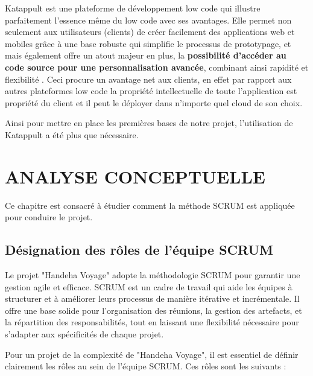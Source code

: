 \documentclass[12pt]{report}
\begin{document}
				Katappult est une plateforme de développement low code qui illustre parfaitement l’essence même du low code avec ses avantages. Elle permet non seulement aux utilisateurs (clients) de créer facilement des applications web et mobiles grâce à une base robuste qui simplifie le processus de prototypage, et mais également offre un atout majeur en plus, la \textbf{possibilité d'accéder au code source pour une personnalisation avancée}, combinant ainsi rapidité et flexibilité \cite{katappult}. Ceci procure un avantage net aux clients, en effet par rapport aux autres plateformes low code la propriété intellectuelle de toute l’application est propriété du client et il peut le déployer dans n’importe quel cloud de son choix.

				Ainsi pour mettre en place les premières bases de notre projet, l’utilisation de Katappult a été plus que nécessaire.




				\chapter{ANALYSE CONCEPTUELLE}

				\hspace{15pt} Ce chapitre est consacré à étudier comment la méthode SCRUM est appliquée pour conduire le projet.

				\section{Désignation des rôles de l’équipe SCRUM}

				\hspace{15pt} Le projet "Handeha Voyage" adopte la méthodologie SCRUM pour garantir une gestion agile et efficace. SCRUM est un cadre de travail qui aide les équipes à structurer et à améliorer leurs processus de manière itérative et incrémentale. Il offre une base solide pour l'organisation des réunions, la gestion des artefacts, et la répartition des responsabilités, tout en laissant une flexibilité nécessaire pour s'adapter aux spécificités de chaque projet.

				Pour un projet de la complexité de "Handeha Voyage", il est essentiel de définir clairement les rôles au sein de l'équipe SCRUM. Ces rôles sont les suivants :
\end{document}

